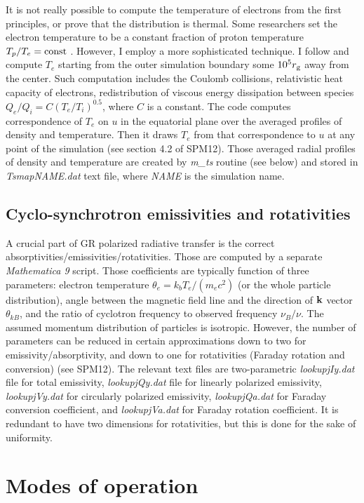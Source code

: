 \documentclass{emulateapj}
\newcommand{\mat}{\textit{Mathematica 9 }}
\begin{document}
It is not really possible to compute the temperature of electrons from the first principles, or prove that the distribution is thermal.
Some researchers set the electron temperature to be a constant fraction of proton temperature $T_p/T_e=\rm const$ \citep{Moscibrodzka:2009,Dexter:2010lk}.
However, I employ a more sophisticated technique. I follow \citet{Sharma_heating:2007} and compute $T_e$ starting from the outer simulation boundary
some $10^5r_{\rm g}$ away from the center. Such computation includes the Coulomb collisions, relativistic heat capacity of electrons,
redistribution of viscous energy dissipation between species $Q_e/Q_i=C(T_e/T_i)^{0.5}$, where $C$ is a constant.
The code computes correspondence of $T_e$ on $u$ in the equatorial plane over the averaged profiles of density and temperature.
Then it draws $T_e$ from that correspondence to $u$ at any point of the simulation (see section 4.2 of SPM12).
Those averaged radial profiles of density and temperature are created by \textit{m\_ts} routine (see below) and stored in \textit{TsmapNAME.dat} text file,
where \textit{NAME} is the simulation name.

\subsection{Cyclo-synchrotron emissivities and rotativities}
A crucial part of GR polarized radiative transfer is the correct absorptivities/emissivities/rotativities.
Those are computed by a separate \mat script. Those coefficients are typically function of three parameters:
electron temperature $\theta_e=k_b T_e/(m_e c^2)$ (or the whole particle distribution), angle between the magnetic field line and the direction of ${\bf k}$ vector
$\theta_{kB}$, and the ratio of cyclotron frequency to observed frequency $\nu_B/\nu$. The assumed momentum distribution of particles is isotropic.
However, the number of parameters can be reduced in certain approximations down to two for emissivity/absorptivity, and down to one for rotativities
(Faraday rotation and conversion) (see SPM12). The relevant text files are two-parametric \textit{lookupjIy.dat} file for total emissivity,
\textit{lookupjQy.dat} file for linearly polarized emissivity, \textit{lookupjVy.dat} for circularly polarized emissivity, \textit{lookupjQa.dat}
for Faraday conversion coefficient, and \textit{lookupjVa.dat} for Faraday rotation coefficient. It is redundant to have two dimensions for rotativities,
but this is done for the sake of uniformity.

\section{Modes of operation}
\end{document}
